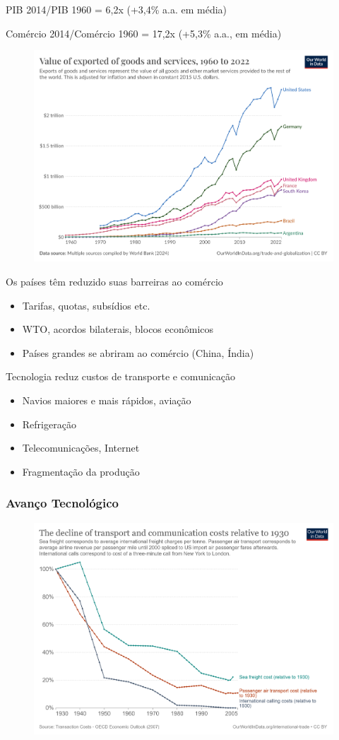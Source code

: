 \documentclass[a4paper,12pt]{article}[abntex2]
\begin{document}
PIB 2014/PIB 1960 = 6,2x (+3,4\% a.a. em média)

Comércio 2014/Comércio 1960 = 17,2x (+5,3\% a.a., em média)

\begin{figure}[H]
    \centering
    \includegraphics[width=0.70\linewidth]{Imagens/a1i3.png}
\end{figure}

Os países têm reduzido suas barreiras ao comércio\begin{itemize}
    \item Tarifas, quotas, subsídios etc.
    \item WTO, acordos bilaterais, blocos econômicos
    \item Países grandes se abriram ao comércio (China, Índia)
\end{itemize}

Tecnologia reduz custos de transporte e comunicação \begin{itemize}
    \item Navios maiores e mais rápidos, aviação
    \item Refrigeração
    \item Telecomunicações, Internet
    \item Fragmentação da produção
\end{itemize}

\subsubsection{\textbf{Avanço Tecnológico}}
\begin{figure}[H]
    \centering
    \includegraphics[width=0.70\linewidth]{Imagens/a1i4.png}
\end{figure}
\end{document}
